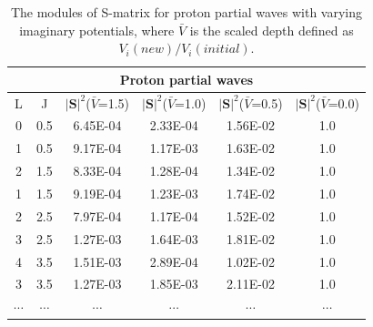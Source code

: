 \documentclass[12pt]{article}
\begin{document}
	\begin{table}[]
\centering
\begin{tabular}{cccccc}
\toprule
\toprule
\multicolumn{6}{c}{Proton partial waves}                                                                         \\
 \midrule
L                     & J                     & $|\mathbf{S}|^2$($\bar{V}$=1.5) & $|\mathbf{S}|^2$($\bar{V}$=1.0) & $|\mathbf{S}|^2$($\bar{V}$=0.5) & $|\mathbf{S}|^2$($\bar{V}$=0.0) \\
0                     & 0.5                   & 6.45E-04                     & 2.33E-04                     & 1.56E-02                     & 1.0                          \\
1                     & 0.5                   & 9.17E-04                     & 1.17E-03                     & 1.63E-02                     & 1.0                          \\
2                     & 1.5                   & 8.33E-04                     & 1.28E-04                     & 1.34E-02                     & 1.0                          \\
1                     & 1.5                   & 9.19E-04                     & 1.23E-03                     & 1.74E-02                     & 1.0                          \\
2                     & 2.5                   & 7.97E-04                     & 1.17E-04                     & 1.52E-02                     & 1.0                          \\
3                     & 2.5                   & 1.27E-03                     & 1.64E-03                     & 1.81E-02                     & 1.0                          \\
4                     & 3.5                   & 1.51E-03                     & 2.89E-04                     & 1.02E-02                     & 1.0                          \\
3                     & 3.5                   & 1.27E-03                     & 1.85E-03                     & 2.11E-02     
	& 1.0                          \\
   
$\cdots$           &$\cdots$                    & $\cdots$                            & $\cdots$                           & $\cdots$                           & $\cdots$                                                                \\
\bottomrule
\bottomrule
\end{tabular}
\caption{The modules of S-matrix for proton partial waves with varying imaginary potentials, where $\bar{V}$ is the scaled depth defined as $V_i(new)/V_i(initial)$.}
\label{pSmatrix}
\end{table}
\end{document}
